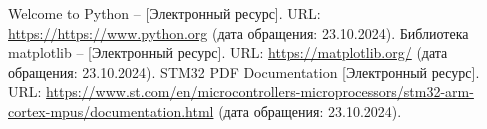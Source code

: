 \begin{thebibliography}{}
    Welcome to Python -- [Электронный ресурс]. URL: \url{https://https://www.python.org} (дата обращения: 23.10.2024).
    Библиотека matplotlib -- [Электронный ресурс]. URL: \url{https://matplotlib.org/} (дата обращения: 23.10.2024).
	STM32 PDF Documentation [Электронный ресурс]. URL: \url{https://www.st.com/en/microcontrollers-microprocessors/stm32-arm-cortex-mpus/documentation.html} (дата обращения: 23.10.2024).
\end{thebibliography}